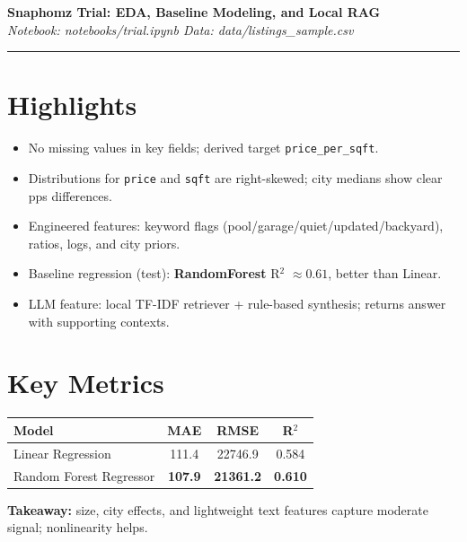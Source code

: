 \documentclass[11pt]{article}
\begin{document}
{\Large \textbf{Snaphomz Trial: EDA, Baseline Modeling, and Local RAG}}\\[4pt]
\textit{Notebook: notebooks/trial.ipynb \quad Data: data/listings\_sample.csv}

\vspace{0.5em}
\hrule\vspace{0.7em}

\section*{Highlights}
\begin{itemize}[leftmargin=*]
  \item No missing values in key fields; derived target \texttt{price\_per\_sqft}.
  \item Distributions for \texttt{price} and \texttt{sqft} are right-skewed; city medians show clear pps differences.
  \item Engineered features: keyword flags (pool/garage/quiet/updated/backyard), ratios, logs, and city priors.
  \item Baseline regression (test): \textbf{RandomForest} R$^2$ \(\approx 0.61\), better than Linear.
  \item LLM feature: local TF-IDF retriever + rule-based synthesis; returns answer with supporting contexts.
\end{itemize}

\section*{Key Metrics}
\vspace{-0.5em}
\begin{center}
\begin{tabular}{lccc}
\toprule
Model & MAE & RMSE & R$^2$ \\
\midrule
Linear Regression & 111.4 & 22746.9 & 0.584 \\
Random Forest Regressor & \textbf{107.9} & \textbf{21361.2} & \textbf{0.610} \\
\bottomrule
\end{tabular}
\end{center}

\vspace{0.4em}
\textbf{Takeaway:} size, city effects, and lightweight text features capture moderate signal; nonlinearity helps.
\end{document}
